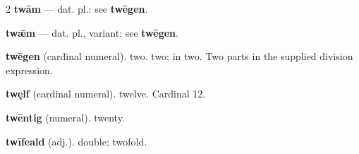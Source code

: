 \begin{multicols*}{2}
\textbf{twām} — dat. pl.: see \textbf{twēgen}.\par
\textbf{twǣm} — dat. pl., variant: see \textbf{twēgen}.\par
\textbf{twēgen} (cardinal numeral). two. two; in two. Two parts in the supplied division expression.\par
\textbf{twęlf} (cardinal numeral). twelve. Cardinal 12.\par
\textbf{twēntig} (numeral). twenty.\par
\textbf{twīfeald} (adj.). double; twofold.\par

\end{multicols*}
